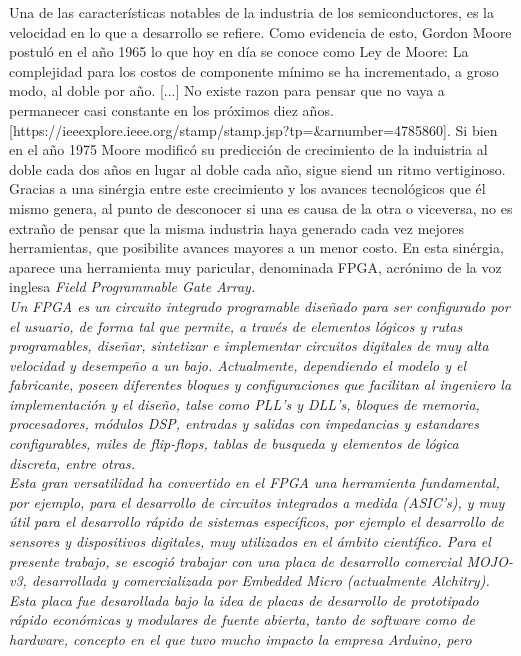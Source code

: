 
	Una de las características notables de la industria de los semiconductores, es la velocidad en lo que a desarrollo se refiere. Como evidencia de esto, Gordon Moore postuló en el año 1965 lo que 
hoy en día se conoce como Ley de Moore: La complejidad para los costos de componente mínimo se ha incrementado, a groso modo, al doble por año. [...] No existe razon para pensar que no vaya a permanecer
casi constante en los próximos diez años.[https://ieeexplore.ieee.org/stamp/stamp.jsp?tp=&arnumber=4785860]. Si bien en el año 1975 Moore modificó su predicción de crecimiento de la induistria al doble
cada dos años en lugar al doble cada año, sigue siend un ritmo vertiginoso.\\
	Gracias a una sinérgia entre este crecimiento y los avances tecnológicos que él mismo genera, al punto de desconocer si una es causa de la otra o viceversa, no es extraño de pensar que la misma 
industria haya generado cada vez mejores herramientas, que posibilite avances mayores a un menor costo. En esta sinérgia, aparece una herramienta muy paricular, denominada FPGA, acrónimo de la voz 
inglesa \it{Field Programmable Gate Array}.\\
	Un FPGA es un circuito integrado programable diseñado para ser configurado por el usuario, de forma tal que permite, a través de elementos lógicos y rutas programables, diseñar, sintetizar e 
implementar circuitos digitales de muy alta velocidad y desempeño a un bajo. Actualmente, dependiendo el modelo y el fabricante, poseen diferentes bloques y configuraciones que facilitan al ingeniero la 
implementación y el diseño, talse como PLL's y DLL's, bloques de memoria, procesadores, módulos DSP, entradas y salidas con impedancias y estandares configurables, miles de flip-flops, tablas de 
busqueda y elementos de lógica discreta, entre otras.\\
	Esta gran versatilidad ha convertido en el FPGA una herramienta fundamental, por ejemplo, para el desarrollo de circuitos integrados a medida (ASIC's), y muy útil para el desarrollo rápido de 
sistemas específicos, por ejemplo el desarrollo de sensores y dispositivos digitales, muy utilizados en el ámbito científico.
	Para el presente trabajo, se escogió trabajar con una placa de desarrollo comercial MOJO-v3, desarrollada y comercializada por Embedded Micro (actualmente Alchitry). Esta placa fue desarollada
bajo la idea de placas de desarrollo de prototipado rápido económicas y modulares de fuente abierta, tanto de software como de hardware, concepto en el que tuvo mucho impacto la empresa Arduino, pero 
